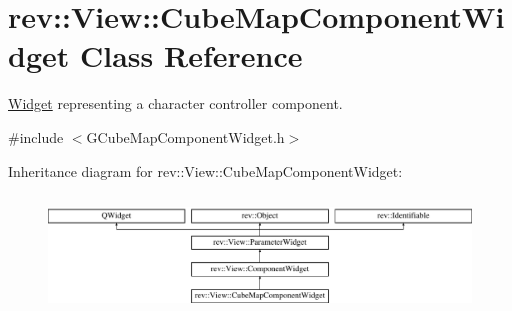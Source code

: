 \hypertarget{classrev_1_1_view_1_1_cube_map_component_widget}{}\section{rev\+::View\+::Cube\+Map\+Component\+Widget Class Reference}
\label{classrev_1_1_view_1_1_cube_map_component_widget}


\mbox{\hyperlink{class_widget}{Widget}} representing a character controller component.  




{\ttfamily \#include $<$G\+Cube\+Map\+Component\+Widget.\+h$>$}

Inheritance diagram for rev\+::View\+::Cube\+Map\+Component\+Widget\+:\begin{figure}[H]
\begin{center}
\leavevmode
\includegraphics[height=3.177305cm]{classrev_1_1_view_1_1_cube_map_component_widget}
\end{center}
\end{figure}
